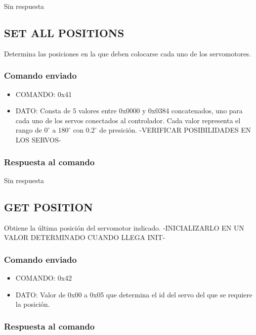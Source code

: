 \documentclass[a4paper,10pt]{article}
\begin{document}
Sin respuesta

\subsection{SET ALL POSITIONS}
\label{set_all_positions}

Determina las posiciones en la que deben colocarse cada uno de los servomotores.

\subsubsection*{Comando enviado}

\begin{itemize}
	\item{COMANDO:} 0x41
	\item{DATO:} Consta de 5 valores entre 0x0000 y 0x0384 concatenados, uno para cada uno de los servos conectados al controlador.
	Cada valor representa el rango de $0^{\circ}$ a $180^{\circ}$ con $0.2^{\circ}$ de presici\'on. -VERIFICAR POSIBILIDADES EN LOS SERVOS-
\end{itemize}

\subsubsection*{Respuesta al comando}

Sin respuesta

\subsection{GET POSITION}
\label{get_position}

Obtiene la \'ultima posici\'on del servomotor indicado. -INICIALIZARLO EN UN VALOR DETERMINADO CUANDO LLEGA INIT-

\subsubsection*{Comando enviado}

\begin{itemize}
	\item{COMANDO:} 0x42
	\item{DATO:} Valor de 0x00 a 0x05 que determina el id del servo del que se requiere la posici\'on.
\end{itemize}

\subsubsection*{Respuesta al comando}
\end{document}
